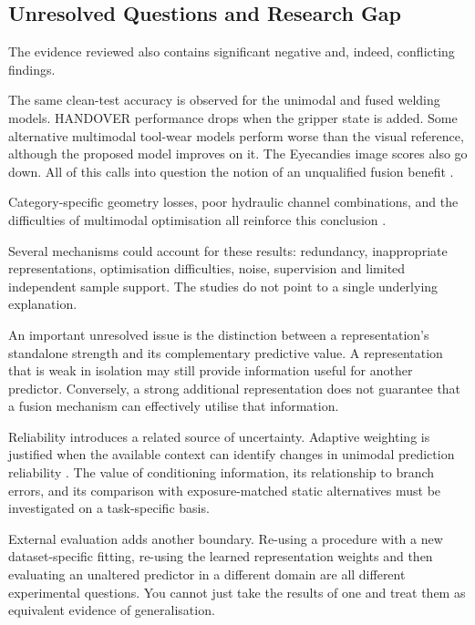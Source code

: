 \ReviewDepthFigure

\subsection{Unresolved Questions and Research Gap}

The evidence reviewed also contains significant negative and, indeed, conflicting findings.

The same clean-test accuracy is observed for the unimodal and fused welding models. HANDOVER
performance drops when the gripper state is added. Some alternative multimodal tool-wear models
perform worse than the visual reference, although the proposed model improves on it. The Eyecandies
image scores also go down. All of this calls into question the notion of an unqualified fusion
benefit \parencite{Hua2026Weld,Thoduka2024Handover,P045,P033}.

Category-specific geometry losses, poor hydraulic channel combinations, and the difficulties of
multimodal optimisation all reinforce this conclusion
\parencite{Horwitz2023Back,Bonfiglioli2023The,Goodarzi2023Deep,Wang2020What}.

Several mechanisms could account for these results: redundancy, inappropriate representations,
optimisation difficulties, noise, supervision and limited independent sample support. The studies do
not point to a single underlying explanation.

An important unresolved issue is the distinction between a representation's standalone strength and
its complementary predictive value. A representation that is weak in isolation may still provide
information useful for another predictor. Conversely, a strong additional representation does not
guarantee that a fusion mechanism can effectively utilise that information.

Reliability introduces a related source of uncertainty. Adaptive weighting is justified when the
available context can identify changes in unimodal prediction reliability \parencite{Zhang2023QMF,P022}.
The value of conditioning information, its relationship to branch errors, and its comparison with
exposure-matched static alternatives must be investigated on a task-specific basis.

External evaluation adds another boundary. Re-using a procedure with a new dataset-specific fitting,
re-using the learned representation weights and then evaluating an unaltered predictor in a
different domain are all different experimental questions. You cannot just take the results of one
and treat them as equivalent evidence of generalisation.

